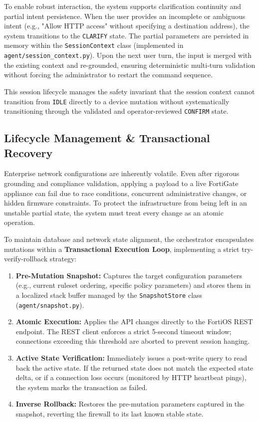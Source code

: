To enable robust interaction, the system supports clarification continuity and partial intent persistence. When the user provides an incomplete or ambiguous intent (e.g., "Allow HTTP access" without specifying a destination address), the system transitions to the \texttt{CLARIFY} state. The partial parameters are persisted in memory within the \texttt{SessionContext} class (implemented in \texttt{agent/session\_context.py}). Upon the next user turn, the input is merged with the existing context and re-grounded, ensuring deterministic multi-turn validation without forcing the administrator to restart the command sequence.

This session lifecycle manages the safety invariant that the session context cannot transition from \texttt{IDLE} directly to a device mutation without systematically transitioning through the validated and operator-reviewed \texttt{CONFIRM} state.

\subsection{Lifecycle Management \& Transactional Recovery}
Enterprise network configurations are inherently volatile. Even after rigorous grounding and compliance validation, applying a payload to a live FortiGate appliance can fail due to race conditions, concurrent administrative changes, or hidden firmware constraints. To protect the infrastructure from being left in an unstable partial state, the system must treat every change as an atomic operation.

To maintain database and network state alignment, the orchestrator encapsulates mutations within a \textbf{Transactional Execution Loop}, implementing a strict try-verify-rollback strategy:
\begin{enumerate}
    \item \textbf{Pre-Mutation Snapshot:} Captures the target configuration parameters (e.g., current ruleset ordering, specific policy parameters) and stores them in a localized stack buffer managed by the \texttt{SnapshotStore} class (\texttt{agent/snapshot.py}).
    \item \textbf{Atomic Execution:} Applies the API changes directly to the FortiOS REST endpoint. The REST client enforces a strict 5-second timeout window; connections exceeding this threshold are aborted to prevent session hanging.
    \item \textbf{Active State Verification:} Immediately issues a post-write query to read back the active state. If the returned state does not match the expected state delta, or if a connection loss occurs (monitored by HTTP heartbeat pings), the system marks the transaction as failed.
    \item \textbf{Inverse Rollback:} Restores the pre-mutation parameters captured in the snapshot, reverting the firewall to its last known stable state.
\end{enumerate}

